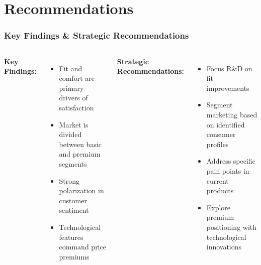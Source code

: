 \documentclass[aspectratio=169]{beamer}
\begin{document}
\section{Recommendations}

\begin{frame}
\frametitle{Key Findings \& Strategic Recommendations}
\begin{columns}
\textbf{Key Findings:}
\begin{itemize}
    \item Fit and comfort are primary drivers of satisfaction
    \item Market is divided between basic and premium segments
    \item Strong polarization in customer sentiment
    \item Technological features command price premiums
\end{itemize}
\textbf{Strategic Recommendations:}
\begin{itemize}
    \item Focus R\&D on fit improvements
    \item Segment marketing based on identified consumer profiles
    \item Address specific pain points in current products
    \item Explore premium positioning with technological innovations
\end{itemize}
\end{columns}
\end{frame}
\end{document}
